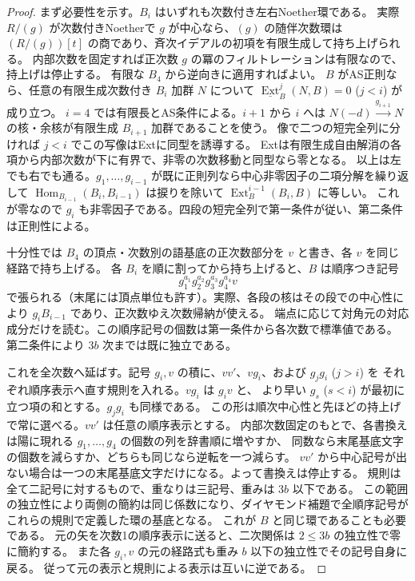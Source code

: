 \begin{proof}
まず必要性を示す。$B_i$ はいずれも次数付き左右Noether環である。
実際 $R/(g)$ が次数付きNoetherで $g$ が中心なら、$(g)$ の随伴次数環は
$(R/(g))[t]$ の商であり、斉次イデアルの初項を有限生成して持ち上げられる。
内部次数を固定すれば正次数 $g$ の冪のフィルトレーションは有限なので、持上げは停止する。
有限な $B_4$ から逆向きに適用すればよい。
$B$ がAS正則なら、任意の有限生成次数付き $B_i$ 加群 $N$ について
$\underline{\operatorname{Ext}}^j_B(N,B)=0$ ($j<i$) が成り立つ。
$i=4$ では有限長とAS条件による。$i+1$ から $i$ へは
$N(-d)\xrightarrow{g_{i+1}}N$ の核・余核が有限生成 $B_{i+1}$ 加群であることを使う。
像で二つの短完全列に分ければ $j<i$ でこの写像はExtに同型を誘導する。
Extは有限生成自由解消の各項から内部次数が下に有界で、非零の次数移動と同型なら零となる。
以上は左でも右でも通る。$g_1,\ldots,g_{i-1}$ が既に正則列なら中心非零因子の二項分解を繰り返して
$\operatorname{Hom}_{B_{i-1}}(B_i,B_{i-1})$ は捩りを除いて $\operatorname{Ext}_B^{i-1}(B_i,B)$ に等しい。
これが零なので $g_i$ も非零因子である。四段の短完全列で第一条件が従い、第二条件は正則性による。

十分性では $B_4$ の頂点・次数別の語基底の正次数部分を $v$ と書き、各 $v$ を同じ経路で持ち上げる。
各 $B_i$ を順に割ってから持ち上げると、$B$ は順序つき記号
\[
                  g_1^{a_1}g_2^{a_2}g_3^{a_3}g_4^{a_4}v
\]
で張られる（末尾には頂点単位も許す）。実際、各段の核はその段での中心性により
$g_i B_{i-1}$ であり、正次数ゆえ次数帰納が使える。
端点に応じて対角元の対応成分だけを読む。この順序記号の個数は第一条件から各次数で標準値である。
第二条件により $3b$ 次までは既に独立である。

これを全次数へ延ばす。記号 $g_i,v$ の積に、$vv'$、$vg_i$、および $g_j g_i$ ($j>i$) を
それぞれ順序表示へ直す規則を入れる。$vg_i$ は $g_i v$ と、
より早い $g_s$ ($s<i$) が最初に立つ項の和とする。$g_jg_i$ も同様である。
この形は順次中心性と先ほどの持上げで常に選べる。$vv'$ は任意の順序表示とする。
内部次数固定のもとで、各書換えは陽に現れる $g_1,\ldots,g_4$ の個数の列を辞書順に増やすか、
同数なら末尾基底文字の個数を減らすか、どちらも同じなら逆転を一つ減らす。
$vv'$ から中心記号が出ない場合は一つの末尾基底文字だけになる。よって書換えは停止する。
規則は全て二記号に対するもので、重なりは三記号、重みは $3b$ 以下である。
この範囲の独立性により両側の簡約は同じ係数になり、ダイヤモンド補題で全順序記号が
これらの規則で定義した環の基底となる。
これが $B$ と同じ環であることも必要である。
元の矢を次数1の順序表示に送ると、二次関係は $2\le3b$ の独立性で零に簡約する。
また各 $g_i,v$ の元の経路式も重み $b$ 以下の独立性でその記号自身に戻る。
従って元の表示と規則による表示は互いに逆である。


\end{proof}
